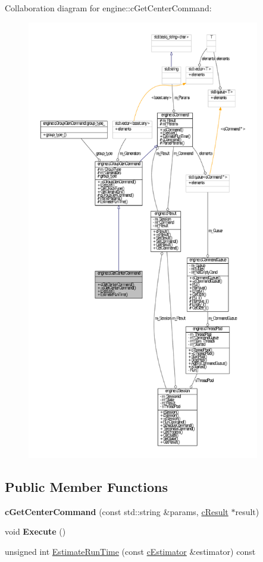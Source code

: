 \-Collaboration diagram for engine\-:\-:c\-Get\-Center\-Command\-:\nopagebreak
\begin{figure}[H]
\begin{center}
\leavevmode
\includegraphics[height=550pt]{classengine_1_1cGetCenterCommand__coll__graph}
\end{center}
\end{figure}
\subsection*{\-Public \-Member \-Functions}
\begin{DoxyCompactItemize}
\item 
\hypertarget{classengine_1_1cGetCenterCommand_ae215414c205174cc048d63174f19fd3a}{{\bfseries c\-Get\-Center\-Command} (const std\-::string \&params, \hyperlink{classengine_1_1cResult}{c\-Result} $\ast$result)}\label{classengine_1_1cGetCenterCommand_ae215414c205174cc048d63174f19fd3a}

\item 
\hypertarget{classengine_1_1cGetCenterCommand_a7d2754e5ade6a96e6043547a7f2b1a03}{void {\bfseries \-Execute} ()}\label{classengine_1_1cGetCenterCommand_a7d2754e5ade6a96e6043547a7f2b1a03}

\item 
unsigned int \hyperlink{classengine_1_1cGetCenterCommand_ab00fa221228c2550e8f664c6d887e1e0}{\-Estimate\-Run\-Time} (const \hyperlink{classengine_1_1cEstimator}{c\-Estimator} \&estimator) const 
\end{DoxyCompactItemize}


